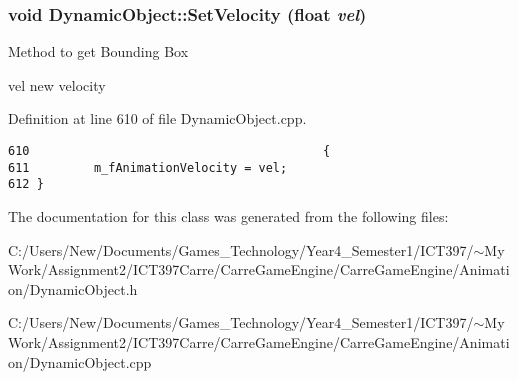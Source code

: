 \hypertarget{class_dynamic_object_056fb17fa06596d19a9fd3a269cb9da3}{
\subsubsection[SetVelocity]{\setlength{\rightskip}{0pt plus 5cm}void DynamicObject::SetVelocity (float {\em vel})}}
\label{class_dynamic_object_056fb17fa06596d19a9fd3a269cb9da3}


Method to get Bounding Box

vel new velocity 

Definition at line 610 of file DynamicObject.cpp.

\begin{Code}\begin{verbatim}610                                         {
611         m_fAnimationVelocity = vel;
612 }
\end{verbatim}
\end{Code}




The documentation for this class was generated from the following files:\begin{CompactItemize}
\item 
C:/Users/New/Documents/Games\_\-Technology/Year4\_\-Semester1/ICT397/$\sim$My Work/Assignment2/ICT397Carre/CarreGameEngine/CarreGameEngine/Animation/DynamicObject.h\item 
C:/Users/New/Documents/Games\_\-Technology/Year4\_\-Semester1/ICT397/$\sim$My Work/Assignment2/ICT397Carre/CarreGameEngine/CarreGameEngine/Animation/DynamicObject.cpp\end{CompactItemize}
